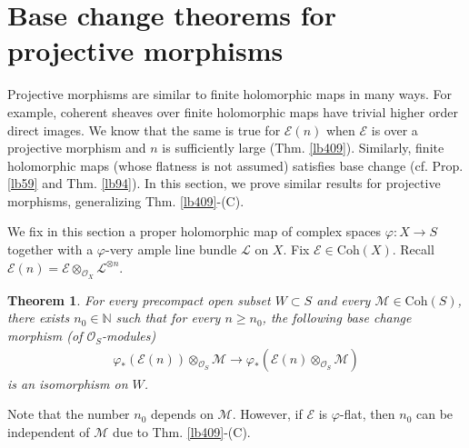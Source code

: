 \documentclass[12pt,b5paper,notitlepage]{report}
\theoremstyle{definition}
\theoremstyle{plain}
\newtheorem{thm}[df]{Theorem}
\newcommand{\scr}{\mathscr}
\newcommand{\Nbb}{\mathbb N}
\newcommand{\Coh}{\mathrm{Coh}}
\numberwithin{equation}{section}
\begin{document}
\section{Base change theorems for projective morphisms}



Projective morphisms are similar to finite holomorphic maps in many ways. For example, coherent sheaves over finite holomorphic maps have trivial higher order direct images. We know that the same is true for $\scr E(n)$ when $\scr E$ is over a projective morphism and $n$ is sufficiently large (Thm. \ref{lb409}). Similarly, finite holomorphic maps (whose flatness is not assumed) satisfies base change (cf. Prop. \ref{lb59} and Thm. \ref{lb94}). In this section, we prove similar results for projective morphisms, generalizing Thm. \ref{lb409}-(C).


We fix in this section a proper holomorphic map of complex spaces $\varphi:X\rightarrow S$ together with a $\varphi$-very ample line bundle $\scr L$ on $X$. Fix $\scr E\in\Coh(X)$. Recall $\scr E(n)=\scr E\otimes_{\scr O_X}\scr L^{\otimes n}$.





\begin{thm}\label{lb412}
For every precompact open subset $W\subset S$ and every $\scr M\in\Coh(S)$, there exists $n_0\in\Nbb$ such that for every $n\geq n_0$, the following base change morphism (of $\scr O_S$-modules)
\begin{align}
\varphi_*(\scr E(n))\otimes_{\scr O_S}\scr M\longrightarrow\varphi_*(\scr E(n)\otimes_{\scr O_S}\scr M)  \label{eq218}
\end{align}
is an isomorphism on $W$. 
\end{thm}


Note that the number $n_0$ depends on $\scr M$. However, if $\scr E$ is $\varphi$-flat, then $n_0$ can be independent of $\scr M$ due to Thm. \ref{lb409}-(C).
\end{document}
